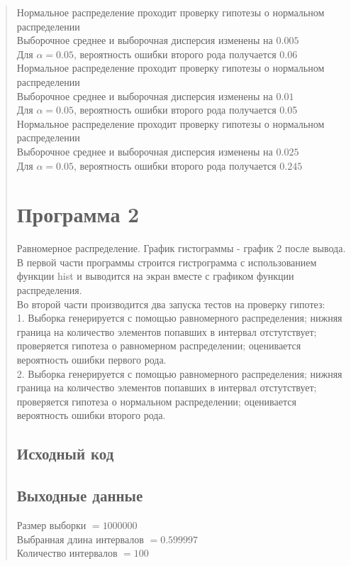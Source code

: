 \documentclass{article}
\begin{document}
\begin{quote}
	Нормальное распределение проходит проверку гипотезы о нормальном распределении \\
	Выборочное среднее и выборочная дисперсия изменены на $0.005$ \\
	Для $\alpha = 0.05$, вероятность ошибки второго рода получается $0.06$ \\

	Нормальное распределение проходит проверку гипотезы о нормальном распределении \\
	Выборочное среднее и выборочная дисперсия изменены на $0.01$ \\
	Для $\alpha = 0.05$, вероятность ошибки второго рода получается 0.05 \\

	Нормальное распределение проходит проверку гипотезы о нормальном распределении \\
	Выборочное среднее и выборочная дисперсия изменены на $0.025$ \\
	Для $\alpha = 0.05$, вероятность ошибки второго рода получается $0.245$ \\

\section{Программа 2}
	Равномерное распределение. График гистограммы - график 2 после вывода. \\
	В первой части программы строится гистрограмма с использованием функции hist и выводится на экран вместе с графиком функции распределения. \\
	Во второй части производится два запуска тестов на проверку гипотез: \\
	1. Выборка генерируется с помощью равномерного распределения; нижняя граница на количество элементов попавших в интервал отстутствует; проверяется гипотеза о равномерном распределении; оценивается вероятность ошибки первого рода. \\
	2. Выборка генерируется с помощью равномерного распределения; нижняя граница на количество элементов попавших в интервал отстутствует; проверяется гипотеза о нормальном распределении; оценивается вероятность ошибки второго рода. \\
\subsection{Исходный код}
	
\subsection{Выходные данные}
	Размер выборки $= 1000000$ \\
	Выбранная длина интервалов $= 0.599997$ \\
	Количество интервалов $= 100$ \\


\end{quote}
\end{document}
